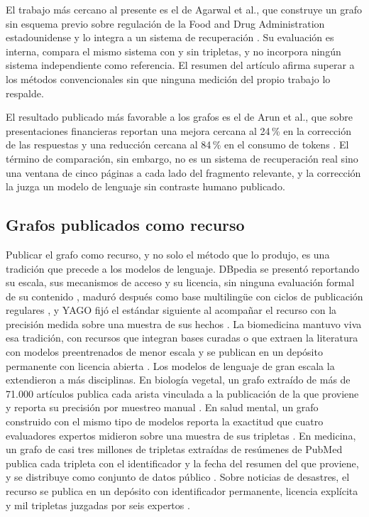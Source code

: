 \documentclass[12pt,a4paper]{report}
\begin{document}
El trabajo más cercano al presente es el de Agarwal et al., que construye un grafo sin esquema previo sobre regulación de la Food and Drug Administration estadounidense y lo integra a un sistema de recuperación \cite{agarwal2025ragulating}. Su evaluación es interna, compara el mismo sistema con y sin tripletas, y no incorpora ningún sistema independiente como referencia. El resumen del artículo afirma superar a los métodos convencionales sin que ninguna medición del propio trabajo lo respalde.

El resultado publicado más favorable a los grafos es el de Arun et al., que sobre presentaciones financieras reportan una mejora cercana al 24\,\% en la corrección de las respuestas y una reducción cercana al 84\,\% en el consumo de tokens \cite{arun2025finreflectmultihop}. El término de comparación, sin embargo, no es un sistema de recuperación real sino una ventana de cinco páginas a cada lado del fragmento relevante, y la corrección la juzga un modelo de lenguaje sin contraste humano publicado.

\subsection{Grafos publicados como recurso}

Publicar el grafo como recurso, y no solo el método que lo produjo, es una tradición que precede a los modelos de lenguaje. DBpedia se presentó reportando su escala, sus mecanismos de acceso y su licencia, sin ninguna evaluación formal de su contenido \cite{auer2007dbpedia}, maduró después como base multilingüe con ciclos de publicación regulares \cite{lehmann2015dbpedia}, y YAGO fijó el estándar siguiente al acompañar el recurso con la precisión medida sobre una muestra de sus hechos \cite{suchanek2007yago}. La biomedicina mantuvo viva esa tradición, con recursos que integran bases curadas \cite{chandak2023primekg} o que extraen la literatura con modelos preentrenados de menor escala y se publican en un depósito permanente con licencia abierta \cite{zhang2025ikraph}. Los modelos de lenguaje de gran escala la extendieron a más disciplinas. En biología vegetal, un grafo extraído de más de 71.000 artículos publica cada arista vinculada a la publicación de la que proviene y reporta su precisión por muestreo manual \cite{lim2025plantconnectome}. En salud mental, un grafo construido con el mismo tipo de modelos reporta la exactitud que cuatro evaluadores expertos midieron sobre una muestra de sus tripletas \cite{gao2025mdkg}. En medicina, un grafo de casi tres millones de tripletas extraídas de resúmenes de PubMed publica cada tripleta con el identificador y la fecha del resumen del que proviene, y se distribuye como conjunto de datos público \cite{zhang2025medkgent}. Sobre noticias de desastres, el recurso se publica en un depósito con identificador permanente, licencia explícita y mil tripletas juzgadas por seis expertos \cite{ronco2026disaster}.
\end{document}
